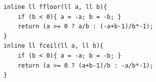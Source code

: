 \begin{verbatim}
inline ll ffloor(ll a, ll b){
	if (b < 0){ a = -a; b = -b; }
	return (a >= 0 ? a/b : (-a+b-1)/b*-1);
}
inline ll fceil(ll a, ll b){
	if (b < 0){ a = -a; b = -b; }
	return (a >= 0 ? (a+b-1)/b : -a/b*-1);
}
\end{verbatim}